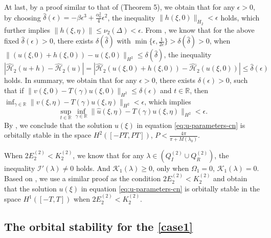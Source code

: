 \documentclass[11pt,reqno]{amsart}
\numberwithin{equation}{section}
\begin{document}
\begin{proof-orbital-cn}
	At last, by a proof similar to that of \cite{LingS-23-mKdV-stability} (Theorem 5),
	we obtain that for any $\epsilon>0$, by choosing $\hat{\delta}(\epsilon)=-\beta\epsilon^3+\frac{\alpha_0^2}{4}\epsilon^2$, the inequality $\|h(\xi,0)\|_{H_2}<\epsilon$ holds, which further implies $\|h(\xi,\eta)\|\le\nu_2(\Delta)<\epsilon$.
	From , we know that for the above fixed  $\hat{\delta}(\epsilon)>0$, there exists $\delta(\hat{\delta})$ with $\min\{\epsilon,\frac{1}{2c}\}>\delta(\hat{\delta})>0$, when $\|(u(\xi,0)+h(\xi,0))-u(\xi,0)\|_{H^2}\le \delta(\hat{\delta})$, the inequality
	$|\mathcal{\hat{H}}_2(u+h)-\mathcal{\hat{H}}_2(u)| 
	=|\mathcal{\hat{H}}_2(u(\xi,0)+h(\xi,0))-\mathcal{\hat{H}}_2(u(\xi,0))| \le  \hat{\delta}(\epsilon)$ holds.
	In summary, we obtain that for any $\epsilon>0$, there exists $\delta(\epsilon)>0$, such that if $\|v(\xi,0)-T(\gamma)u(\xi,0)\|_{H^2}\le \delta(\epsilon)$ and $t\in\mathbb{R}$, then $\inf_{\gamma\in \mathbb{R}} \|v(\xi,\eta)-T(\gamma)u(\xi,\eta)\|_{H^2}< \epsilon$, which implies
	\begin{equation}\nonumber
		\sup_{t\in\mathbb{R}} \inf_{\gamma\in \mathbb{R}} \|\hat{u}(\xi,\eta)-T(\gamma)u(\xi,\eta)\|_{H^2} < \epsilon. 
	\end{equation}
	By , we conclude that the solution $u(\xi)$ in equation \eqref{eq:u-parameters-cn} is orbitally stable in the space $H^2([-PT,PT])$, $P<\frac{4\pi}{\pi+M(\lambda_0)}$.
\end{proof-orbital-cn}

	When $2 E^{(2)}_2<   K^{(2)}_2$, we know that for any $\lambda\in ( Q^{(2)} _I\cup  Q^{(2)} _R)$, the inequality $\mathcal{I}'(\lambda)\neq0$ holds. And $\mathcal{K}_1(\lambda)\ge 0$, only when $\Omega_1=0$, $\mathcal{K}_1(\lambda)=0$. Based on , we use a similar proof as the condition $2 E^{(2)}_2<   K^{(2)}_2$ and obtain that the solution $u(\xi)$ in equation \eqref{eq:u-parameters-cn} is orbitally stable in the space $H^1([-T,T])$ when $2E^{(2)}_2<K^{(2)}_2$.


\subsection{The orbital stability for the \ref{case1}}\label{subsec:orbital-dn}
\end{document}
